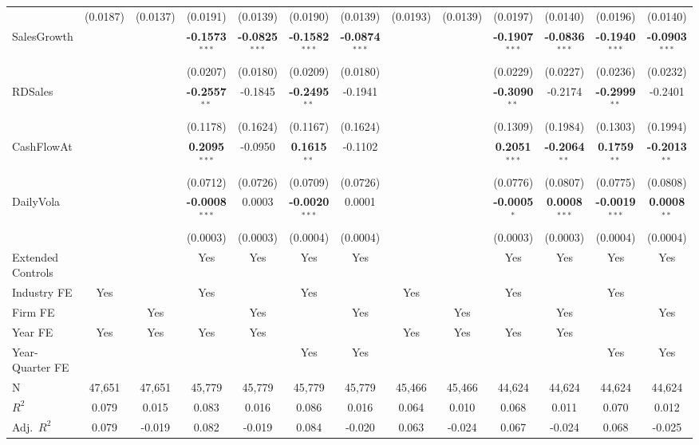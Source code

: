 \documentclass[11pt,a4paper]{article}
\begin{document}
\begin{table}[htbp]
\begin{tabular}{lcccccccccccc}
 & (0.0187) & (0.0137) & (0.0191) & (0.0139) & (0.0190) & (0.0139) & (0.0193) & (0.0139) & (0.0197) & (0.0140) & (0.0196) & (0.0140) \\
SalesGrowth &  &  & \textbf{-0.1573}$^{***}$ & \textbf{-0.0825}$^{***}$ & \textbf{-0.1582}$^{***}$ & \textbf{-0.0874}$^{***}$ &  &  & \textbf{-0.1907}$^{***}$ & \textbf{-0.0836}$^{***}$ & \textbf{-0.1940}$^{***}$ & \textbf{-0.0903}$^{***}$ \\
 &  &  & (0.0207) & (0.0180) & (0.0209) & (0.0180) &  &  & (0.0229) & (0.0227) & (0.0236) & (0.0232) \\
RDSales &  &  & \textbf{-0.2557}$^{**}$ & -0.1845 & \textbf{-0.2495}$^{**}$ & -0.1941 &  &  & \textbf{-0.3090}$^{**}$ & -0.2174 & \textbf{-0.2999}$^{**}$ & -0.2401 \\
 &  &  & (0.1178) & (0.1624) & (0.1167) & (0.1624) &  &  & (0.1309) & (0.1984) & (0.1303) & (0.1994) \\
CashFlowAt &  &  & \textbf{0.2095}$^{***}$ & -0.0950 & \textbf{0.1615}$^{**}$ & -0.1102 &  &  & \textbf{0.2051}$^{***}$ & \textbf{-0.2064}$^{**}$ & \textbf{0.1759}$^{**}$ & \textbf{-0.2013}$^{**}$ \\
 &  &  & (0.0712) & (0.0726) & (0.0709) & (0.0726) &  &  & (0.0776) & (0.0807) & (0.0775) & (0.0808) \\
DailyVola &  &  & \textbf{-0.0008}$^{***}$ & 0.0003 & \textbf{-0.0020}$^{***}$ & 0.0001 &  &  & \textbf{-0.0005}$^{*}$ & \textbf{0.0008}$^{***}$ & \textbf{-0.0019}$^{***}$ & \textbf{0.0008}$^{**}$ \\
 &  &  & (0.0003) & (0.0003) & (0.0004) & (0.0004) &  &  & (0.0003) & (0.0003) & (0.0004) & (0.0004) \\
\midrule
Extended Controls &  &  & Yes & Yes & Yes & Yes &  &  & Yes & Yes & Yes & Yes \\
Industry FE & Yes &  & Yes &  & Yes &  & Yes &  & Yes &  & Yes &  \\
Firm FE &  & Yes &  & Yes &  & Yes &  & Yes &  & Yes &  & Yes \\
Year FE & Yes & Yes & Yes & Yes &  &  & Yes & Yes & Yes & Yes &  &  \\
Year-Quarter FE &  &  &  &  & Yes & Yes &  &  &  &  & Yes & Yes \\
\midrule
N & 47,651 & 47,651 & 45,779 & 45,779 & 45,779 & 45,779 & 45,466 & 45,466 & 44,624 & 44,624 & 44,624 & 44,624 \\
$R^2$ & 0.079 & 0.015 & 0.083 & 0.016 & 0.086 & 0.016 & 0.064 & 0.010 & 0.068 & 0.011 & 0.070 & 0.012 \\
Adj.~$R^2$ & 0.079 & -0.019 & 0.082 & -0.019 & 0.084 & -0.020 & 0.063 & -0.024 & 0.067 & -0.024 & 0.068 & -0.025 \\

\end{tabular}
\end{table}
\end{document}
